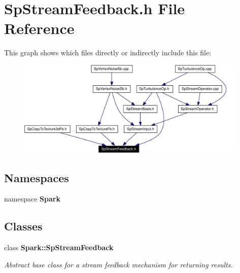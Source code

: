 \section{Sp\-Stream\-Feedback.h File Reference}
\label{SpStreamFeedback_8h}


This graph shows which files directly or indirectly include this file:\begin{figure}[H]
\begin{center}
\leavevmode
\includegraphics[width=313pt]{SpStreamFeedback_8h__dep__incl}
\end{center}
\end{figure}
\subsection*{Namespaces}
\begin{CompactItemize}
\item 
namespace {\bf Spark}
\end{CompactItemize}
\subsection*{Classes}
\begin{CompactItemize}
\item 
class {\bf Spark::Sp\-Stream\-Feedback}
\begin{CompactList}\small\item\em Abstract base class for a stream feedback mechanism for returning results. \item\end{CompactList}\end{CompactItemize}

